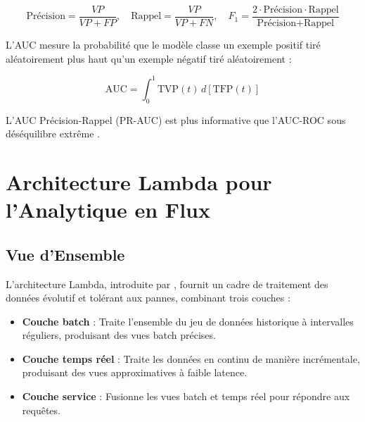 \documentclass[12pt,a4paper,oneside]{book}
\theoremstyle{definition}
\theoremstyle{plain}
\begin{document}
\begin{equation}
  \text{Précision} = \frac{VP}{VP + FP}, \quad
  \text{Rappel} = \frac{VP}{VP + FN}, \quad
  F_1 = \frac{2 \cdot \text{Précision} \cdot \text{Rappel}}{\text{Précision} + \text{Rappel}}
  \label{eq:metrics}
\end{equation}

L'AUC mesure la probabilité que le modèle classe un exemple positif tiré aléatoirement plus haut qu'un exemple négatif tiré aléatoirement :

\begin{equation}
  \text{AUC} = \int_0^1 \text{TVP}(t)\, d[\text{TFP}(t)]
  \label{eq:auc}
\end{equation}

L'AUC Précision-Rappel (PR-AUC) est plus informative que l'AUC-ROC sous déséquilibre extrême \citep{davis2006relationship}.

\section{Architecture Lambda pour l'Analytique en Flux}

\subsection{Vue d'Ensemble}

L'architecture Lambda, introduite par \citet{marz2015big}, fournit un cadre de traitement des données évolutif et tolérant aux pannes, combinant trois couches :

\begin{itemize}
  \item \textbf{Couche batch} : Traite l'ensemble du jeu de données historique à intervalles réguliers, produisant des vues batch précises.
  \item \textbf{Couche temps réel} : Traite les données en continu de manière incrémentale, produisant des vues approximatives à faible latence.
  \item \textbf{Couche service} : Fusionne les vues batch et temps réel pour répondre aux requêtes.
\end{itemize}
\end{document}
